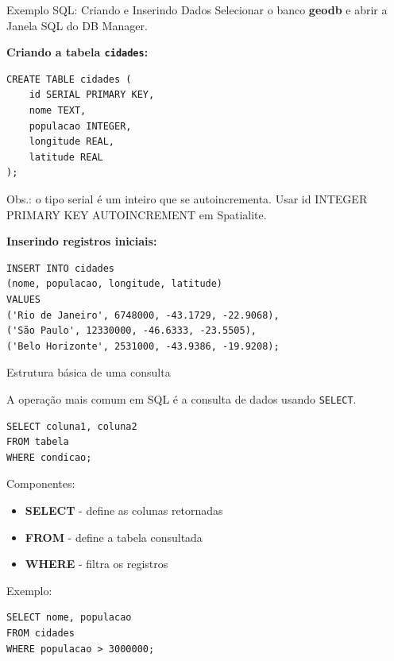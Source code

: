 \documentclass{beamer}
\begin{document}
\begin{frame}[fragile]{Exemplo SQL: Criando e Inserindo Dados}
Selecionar o banco \textbf{geodb} e abrir a Janela SQL do DB Manager.  

\vspace{0.3cm}
\textbf{Criando a tabela \texttt{cidades}:}

\begin{verbatim}
CREATE TABLE cidades (
    id SERIAL PRIMARY KEY,
    nome TEXT,
    populacao INTEGER,
    longitude REAL,
    latitude REAL
);
\end{verbatim}
{\tiny Obs.: o tipo serial é um inteiro que se autoincrementa. Usar id INTEGER PRIMARY KEY AUTOINCREMENT em Spatialite.}
\vspace{0.3cm}

\textbf{Inserindo registros iniciais:}

\begin{verbatim}
INSERT INTO cidades
(nome, populacao, longitude, latitude)
VALUES
('Rio de Janeiro', 6748000, -43.1729, -22.9068),
('São Paulo', 12330000, -46.6333, -23.5505),
('Belo Horizonte', 2531000, -43.9386, -19.9208);
\end{verbatim}


\end{frame}


\begin{frame}[fragile]{Estrutura básica de uma consulta}
    
    A operação mais comum em SQL é a consulta de dados usando \texttt{SELECT}.
    
    \begin{verbatim}
SELECT coluna1, coluna2
FROM tabela
WHERE condicao;
    \end{verbatim}
    
    Componentes:
    
    \begin{itemize}
        \item \textbf{SELECT} - define as colunas retornadas
        \item \textbf{FROM} - define a tabela consultada
        \item \textbf{WHERE} - filtra os registros
    \end{itemize}
    
    Exemplo:
    
    \begin{verbatim}
SELECT nome, populacao
FROM cidades
WHERE populacao > 3000000;
    \end{verbatim}
    
\end{frame}
\end{document}
